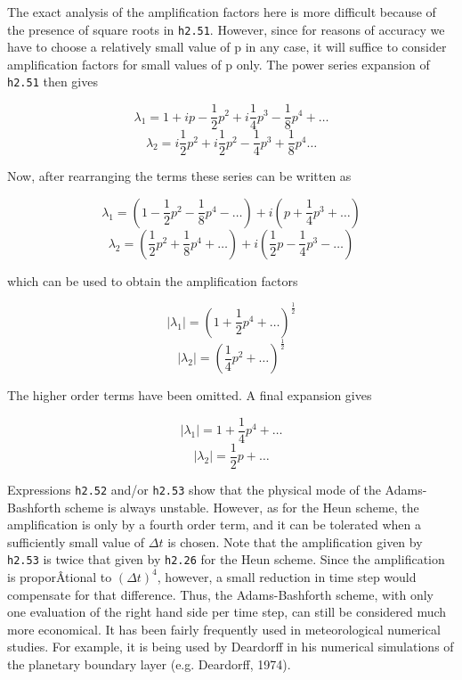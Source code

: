 The exact analysis of the amplification factors here is more difficult
because of the presence of square roots in \texttt{h2.51}. However,
since for reasons of accuracy we have to choose a relatively small value
of p in any case, it will suffice to consider amplification factors for
small values of p only. The power series expansion of \texttt{h2.51}
then gives

\[\lambda_{1} = 1 + ip - \frac{1}{2}p^{2} + i\frac{1}{4}p^{3} - \frac{1}{8}p^{4} + \ldots\]\[\lambda_{2} = i\frac{1}{2}p^{2} + i\frac{1}{2}p^{2} - \frac{1}{4}p^{3} + \frac{1}{8}p^{4}\ldots\]

Now, after rearranging the terms these series can be written as

\[\lambda_{1} = \left( 1 - \frac{1}{2}p^{2} - \frac{1}{8}p^{4} - \ldots \right) + i\left( p + \frac{1}{4}p^{3} + \ldots \right)\]\[\lambda_{2} = \left( \frac{1}{2}p^{2} + \frac{1}{8}p^{4} + \ldots \right) + i\left( \frac{1}{2}p - \frac{1}{4}p^{3} - \ldots \right)\]

which can be used to obtain the amplification factors

\[\left| \lambda_{1} \right| = \left( 1 + \frac{1}{2}p^{4} + \ldots \right)^{\frac{1}{2}}\]\[\left| \lambda_{2} \right| = \left( \frac{1}{4}p^{2} + \ldots \right)^{\frac{1}{2}}\]

The higher order terms have been omitted. A final expansion gives

\[\left| \lambda_{1} \right| = 1 + \frac{1}{4}p^{4} + \ldots\]\[\left| \lambda_{2} \right| = \frac{1}{2}p + \ldots\]

Expressions \texttt{h2.52} and/or \texttt{h2.53} show that the physical
mode of the Adams-Bashforth scheme is always unstable. However, as for
the Heun scheme, the amplification is only by a fourth order term, and
it can be tolerated when a sufficiently small value of \(\Delta t\) is
chosen. Note that the amplification given by \texttt{h2.53} is twice
that given by \texttt{h2.26} for the Heun scheme. Since the
amplification is proporÂ­tional to \(\left( \Delta t \right)^{4}\),
however, a small reduction in time step would compensate for that
difference. Thus, the Adams-Bashforth scheme, with only one evaluation
of the right hand side per time step, can still be considered much more
economical. It has been fairly frequently used in meteorological
numerical studies. For example, it is being used by Deardorff in his
numerical simulations of the planetary boundary layer (e.g. Deardorff,
1974).


